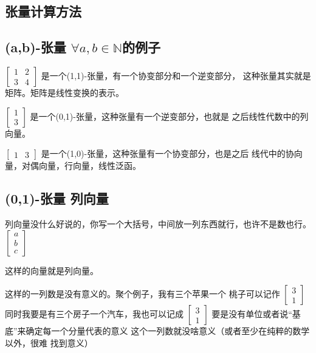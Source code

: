 \documentclass{book}
\begin{document}
\begin{CJK}{UTF8}{gbsn}
    \section{张量计算方法}

    \subsection{(a,b)-张量 \texorpdfstring{$\forall a,b \in \mathbb{N}$}{∀a,b∈N}的例子}

    $\left[\begin{matrix}
                1 & 2 \\
                3 & 4
            \end{matrix}\right]$
    是一个(1,1)-张量，有一个协变部分和一个逆变部分，
    这种张量其实就是矩阵。矩阵是线性变换的表示。

    $\left[\begin{matrix}
                1 \\
                3
            \end{matrix}\right]$
    是一个(0,1)-张量，这种张量有一个逆变部分，也就是
    之后线性代数中的列向量。

    $\left[\begin{matrix}
                1 & 3
            \end{matrix}\right]$
    是一个(1,0)-张量，这种张量有一个协变部分，也是之后
    线代中的协向量，对偶向量，行向量，线性泛函。

    \subsection{(0,1)-张量 列向量}
    列向量没什么好说的，你写一个大括号，中间放一列东西就行，也许不是数也行。
    $\left[\begin{matrix}
                a \\
                b \\
                c
            \end{matrix}\right]$

    这样的向量就是列向量。

    这样的一列数是没有意义的。聚个例子，我有三个苹果一个
    桃子可以记作
    $\left[\begin{matrix}
                3 \\
                1
            \end{matrix}\right]$
    同时我要是有三个房子一个汽车，我也可以记成
    $\left[\begin{matrix}
                3 \\
                1
            \end{matrix}\right]$
    要是没有单位或者说“基底”来确定每一个分量代表的意义
    这个一列数就没啥意义（或者至少在纯粹的数学以外，很难
    找到意义）


\end{CJK}
\end{document}
